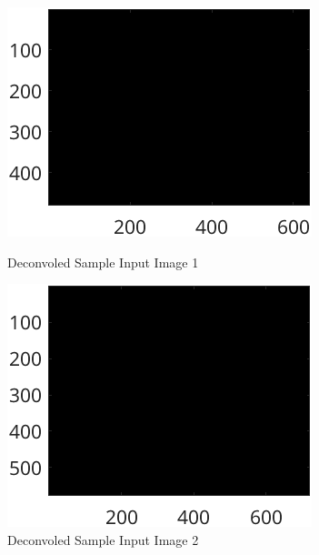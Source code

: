 \documentclass{article}
\begin{document}
\begin{itemize}
  		\begin{figure}[ht]
  			\centering
  			\begin{minipage}[t]{0.45\textwidth}
    			\centering
    			\includegraphics[width=\textwidth]{2AE1K0.01_laplacian}
    			\caption{Deconvoled Sample Input Image 1}
    			\label{fig:laplacian_decon}
  			\end{minipage}\hfill
  			\begin{minipage}[t]{0.45\textwidth}
    			\centering
    			\includegraphics[width=\textwidth]{2AE2K0.01_sobel}
    			\caption{Deconvoled Sample Input Image 2}
    			\label{fig:sobel_decon}
  			\end{minipage}
			\end{figure}


\end{itemize}
\end{document}
